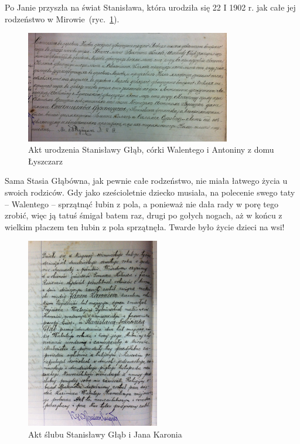 Po Janie przyszła na świat Stanisława, która urodziła się 22 I 1902 r. jak całe jej rodzeństwo w Mirowie~(ryc.~\ref{rys:akt_urodzenia_stanislawy_glab}). 

\begin{figure}
\begin{center}
\includegraphics[width=0.8\textwidth]{zdjecia/akt_urodzenia_stanislawy_glab.jpg}
\caption[Akt urodzenia Stanisławy Głąb]{Akt urodzenia Stanisławy Głąb, córki Walentego i Antoniny z domu Łyszczarz}
\label{rys:akt_urodzenia_stanislawy_glab}
\end{center}
\end{figure}

Sama Stasia Głąbówna, jak pewnie całe rodzeństwo, nie miała łatwego życia u swoich rodziców. Gdy jako sześcioletnie dziecko musiała, na polecenie swego taty -- Walentego -- sprzątnąć łubin z pola, a ponieważ nie dała rady w porę tego zrobić, więc ją tatuś śmigał batem raz, drugi po gołych nogach, aż w końcu z wielkim płaczem ten łubin z pola sprzątnęła. Twarde było życie dzieci na wsi!

\begin{figure}
\begin{center}
\includegraphics[width=0.52\textwidth]{zdjecia/akt_slubu_stanislawy_i_jana_karoniow.jpg}
\caption{Akt ślubu Stanisławy Głąb i Jana Karonia}
\label{rys:akt_slubu_stanislawy_i_jana_karoniow}
\end{center}
\end{figure}

